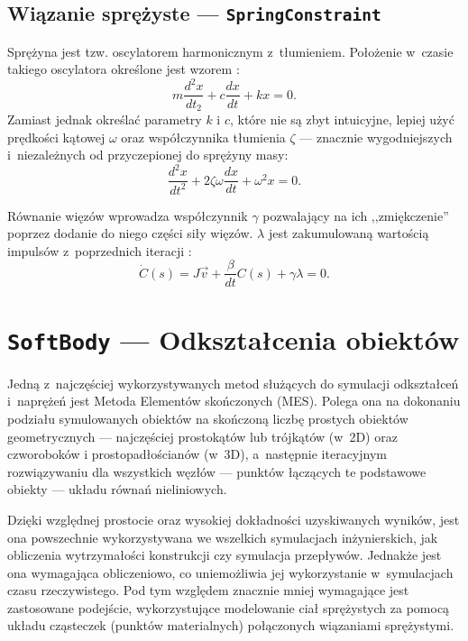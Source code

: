 \subsection{Wiązanie sprężyste --- \texttt{SpringConstraint}}
Sprężyna jest tzw. oscylatorem harmonicznym z~tłumieniem. Położenie w~czasie takiego oscylatora określone jest wzorem \cite{bib:kakol}:
\begin{equation}
m \frac{d^2 x}{dt_2} + c \frac{dx}{dt} + kx = 0.
\end{equation}
Zamiast jednak określać parametry $k$ i $c$, które nie są zbyt intuicyjne, lepiej użyć prędkości kątowej $\omega$ oraz współczynnika tłumienia $\zeta$ --- znacznie wygodniejszych i~niezależnych od przyczepionej do sprężyny masy:
\begin{equation}
\frac{d^2 x}{dt^2} + 2 \zeta \omega \frac{dx}{dt} + \omega^2 x = 0.
\end{equation}

Równanie więzów wprowadza współczynnik $\gamma$ pozwalający na ich ,,zmiękczenie'' poprzez dodanie do niego części siły więzów. $\lambda$ jest zakumulowaną wartością impulsów z~poprzednich iteracji \cite{bib:barnas}:
\begin{equation}
\dot{C}(s) = J\vec{v} + \frac{\beta}{dt} C(s) + \gamma \lambda = 0.
\end{equation}

\section{\texttt{SoftBody} --- Odkształcenia obiektów}
\label{part:odksztalcenia}
Jedną z~najczęściej wykorzystywanych metod służących do symulacji odkształceń i~naprężeń jest Metoda Elementów skończonych (MES). Polega ona na dokonaniu podziału symulowanych obiektów na skończoną liczbę prostych obiektów geometrycznych --- najczęściej prostokątów lub trójkątów (w~2D) oraz czworoboków i prostopadłościanów (w~3D), a~następnie iteracyjnym rozwiązywaniu dla wszystkich węzłów --- punktów łączących te podstawowe obiekty --- układu równań nieliniowych.

Dzięki względnej prostocie oraz wysokiej dokładności uzyskiwanych wyników, jest ona powszechnie wykorzystywana we wszelkich symulacjach inżynierskich, jak obliczenia wytrzymałości konstrukcji czy symulacja przepływów. Jednakże jest ona wymagająca obliczeniowo, co uniemożliwia jej wykorzystanie w~symulacjach czasu rzeczywistego. Pod tym względem znacznie mniej wymagające jest zastosowane podejście, wykorzystujące modelowanie ciał sprężystych za pomocą układu cząsteczek (punktów materialnych) połączonych wiązaniami sprężystymi. 

